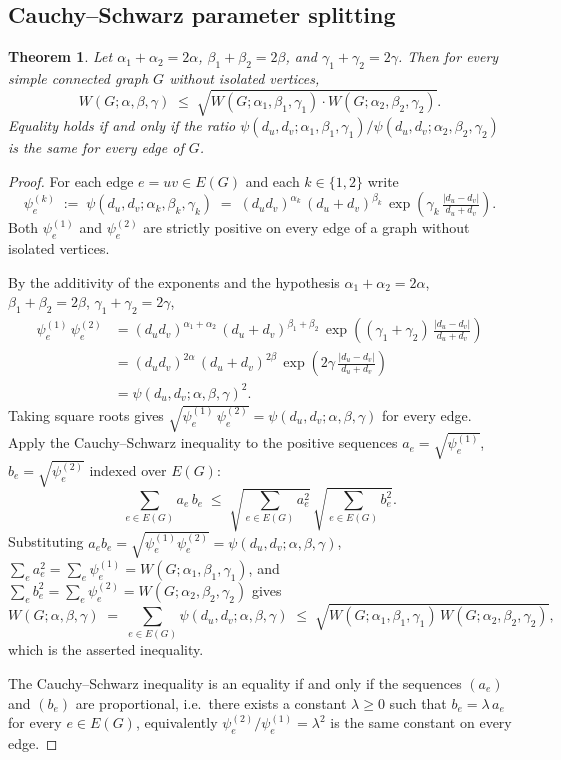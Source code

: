 \documentclass[a5paper, 10pt]{article}
\theoremstyle{plain}
\newtheorem{theorem}{Theorem}
\theoremstyle{remark}
\theoremstyle{definition}
\newcommand{\Wuzi}{W(G;\alpha,\beta,\gamma)}
\begin{document}
\subsection{Cauchy--Schwarz parameter splitting}\label{sub:cs}

\begin{theorem}\label{thm:cs}
Let $\alpha_1 + \alpha_2 = 2\alpha$, $\beta_1 + \beta_2 = 2\beta$,
and $\gamma_1 + \gamma_2 = 2\gamma$. Then for every simple
connected graph $G$ without isolated vertices,
\[
W(G; \alpha, \beta, \gamma)
\;\le\;
\sqrt{W(G; \alpha_1, \beta_1, \gamma_1)
       \cdot W(G; \alpha_2, \beta_2, \gamma_2)}.
\]
Equality holds if and only if the ratio
$\psi(d_u, d_v; \alpha_1, \beta_1, \gamma_1)/\psi(d_u, d_v; \alpha_2, \beta_2, \gamma_2)$
is the same for every edge of $G$.
\end{theorem}

\begin{proof}
For each edge $e = uv \in E(G)$ and each $k \in \{1, 2\}$ write
\[
\psi_e^{(k)}
\;:=\; \psi(d_u, d_v; \alpha_k, \beta_k, \gamma_k)
\;=\; (d_u d_v)^{\alpha_k}\,(d_u + d_v)^{\beta_k}\,
\exp\!\left(\gamma_k\, \tfrac{|d_u - d_v|}{d_u + d_v}\right).
\]
Both $\psi_e^{(1)}$ and $\psi_e^{(2)}$ are strictly positive on
every edge of a graph without isolated vertices.

By the additivity of the exponents and the hypothesis
$\alpha_1 + \alpha_2 = 2\alpha$,
$\beta_1 + \beta_2 = 2\beta$, $\gamma_1 + \gamma_2 = 2\gamma$,
\begin{align*}
\psi_e^{(1)}\,\psi_e^{(2)}
&= (d_u d_v)^{\alpha_1 + \alpha_2}\,(d_u + d_v)^{\beta_1 + \beta_2}\,
   \exp\!\left((\gamma_1 + \gamma_2)\, \tfrac{|d_u - d_v|}{d_u + d_v}\right) \\
&= (d_u d_v)^{2\alpha}\,(d_u + d_v)^{2\beta}\,
   \exp\!\left(2\gamma\, \tfrac{|d_u - d_v|}{d_u + d_v}\right) \\
&= \psi(d_u, d_v; \alpha, \beta, \gamma)^{2}.
\end{align*}
Taking square roots gives
$\sqrt{\psi_e^{(1)}\,\psi_e^{(2)}} = \psi(d_u, d_v; \alpha, \beta, \gamma)$
for every edge. Apply the Cauchy--Schwarz inequality to the
positive sequences $a_e = \sqrt{\psi_e^{(1)}}$,
$b_e = \sqrt{\psi_e^{(2)}}$ indexed over $E(G)$:
\[
\sum_{e \in E(G)} a_e\, b_e
\;\le\;
\sqrt{\sum_{e \in E(G)} a_e^{2}}\,
\sqrt{\sum_{e \in E(G)} b_e^{2}}.
\]
Substituting $a_e b_e = \sqrt{\psi_e^{(1)} \psi_e^{(2)}}
   = \psi(d_u, d_v; \alpha, \beta, \gamma)$,
$\sum_e a_e^2 = \sum_e \psi_e^{(1)} = W(G; \alpha_1, \beta_1, \gamma_1)$,
and $\sum_e b_e^2 = \sum_e \psi_e^{(2)} = W(G; \alpha_2, \beta_2, \gamma_2)$
gives
\[
\Wuzi
\;=\; \sum_{e \in E(G)} \psi(d_u, d_v; \alpha, \beta, \gamma)
\;\le\;
\sqrt{W(G; \alpha_1, \beta_1, \gamma_1)\,
      W(G; \alpha_2, \beta_2, \gamma_2)},
\]
which is the asserted inequality.

The Cauchy--Schwarz inequality is an equality if and only if the
sequences $(a_e)$ and $(b_e)$ are proportional, i.e.\ there exists
a constant $\lambda \ge 0$ such that $b_e = \lambda\, a_e$ for
every $e \in E(G)$, equivalently
$\psi_e^{(2)}/\psi_e^{(1)} = \lambda^{2}$ is the same constant on
every edge.
\end{proof}
\end{document}
